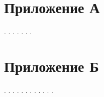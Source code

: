 \appendix
\section*{Приложение А}

\newpage
.
\newpage
.
\newpage
.
\newpage
.
\newpage
.
\newpage
.
\newpage
.
\newpage

\section*{Приложение Б}

\newpage
.
\newpage
.
\newpage
.
\newpage
.
\newpage
.
\newpage
.
\newpage
.
\newpage
.
\newpage
.
\newpage
.
\newpage
.
\newpage
.